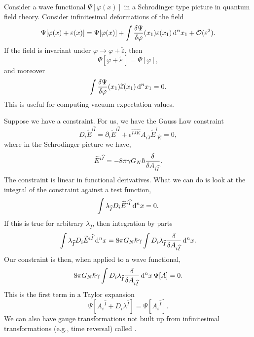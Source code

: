 \lecture

Consider a wave functional $\Psi[\varphi(x)]$ in a Schrodinger type
picture in quantum field theory. Consider infinitesimal deformations of
the field
\begin{equation}
\Psi[\varphi(x)+\varepsilon(x)] = \Psi[\varphi(x)] + \int\frac{\delta\Psi}{\delta\varphi}(x_{1})\varepsilon(x_{1})\,\mathrm{d}^{n}
x_{1} + \mathcal{O}(\varepsilon^{2}).
\end{equation}
If the field is invariant under $\varphi\to\varphi+\widetilde{\varepsilon}$,
then
\begin{equation}
\Psi[\varphi+\widetilde{\varepsilon}\,]=\Psi[\varphi],
\end{equation}
and moreover
\begin{equation}
\int\frac{\delta\Psi}{\delta\varphi}(x_{1})\widetilde{\varepsilon}(x_{1})\,\mathrm{d}^{n} x_{1} = 0.
\end{equation}
This is useful for computing vacuum expectation values.

Suppose we have a constraint. For us, we have the Gauss Law constraint
\begin{equation}
D_{i}\widetilde{E}^{i\widehat{I}}
=\partial_{i}\widetilde{E}^{i\widehat{I}} + \epsilon^{\widehat{I}\widehat{J}\widehat{K}}A_{i\widehat{J}}\widetilde{E}^{i}_{\phantom{i}\widehat{K}}=0,
\end{equation}
where in the Schrodinger picture we have,
\begin{equation}
\widetilde{E}^{i\widehat{I}} = -8\pi\gamma G_{N}\hbar\frac{\delta}{\delta A_{i\widehat{I}}}.
\end{equation}
The constraint is linear in functional derivatives. What we can do is
look at the integral of the constraint against a test function,
\begin{equation}
\int\lambda_{\widehat{I}}D_{i}\widetilde{E}^{i\widehat{I}}\,\mathrm{d}^{n}x=0.
\end{equation}
If this is true for arbitrary $\lambda_{\widehat{I}}$, then integration
by parts
\begin{equation}
\int\lambda_{\widehat{I}}D_{i}\widetilde{E}^{i\widehat{I}}\,\mathrm{d}^{n}x
= 8\pi G_{N}\hbar\gamma\int
D_{i}\lambda_{\widehat{I}}\frac{\delta}{\delta A_{i\widehat{I}}}\,\mathrm{d}^{n}x.
\end{equation}
Our constraint is then, when applied to a wave functional,
\begin{equation}
8\pi G_{N}\hbar\gamma\int
D_{i}\lambda_{\widehat{I}}\frac{\delta}{\delta A_{i\widehat{I}}}\,\mathrm{d}^{n}x\,\Psi[A]=0.
\end{equation}
This is the first term in a Taylor expansion
\begin{equation}
\Psi[{A_{i}}^{\widehat{I}} + D_{i}\lambda^{\widehat{I}}] = \Psi[{A_{i}}^{\widehat{I}}].
\end{equation}
We can also have gauge transformations not built up from infinitesimal
transformations (e.g., time reversal) called .

